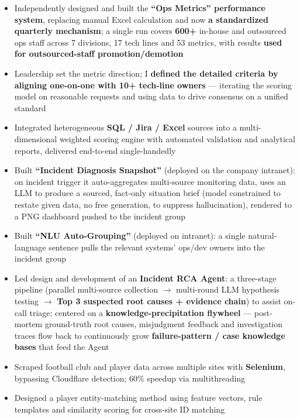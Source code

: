 \documentclass{resume}
\begin{document}
\begin{itemize}[parsep=0.6ex]
  \item Independently designed and built the \textbf{``Ops Metrics'' performance system}, replacing manual Excel calculation and now \textbf{a standardized quarterly mechanism}; a single run covers \textbf{600+} in-house and outsourced ops staff across 7 divisions, 17 tech lines and 53 metrics, with results \textbf{used for outsourced-staff promotion/demotion}
  \item Leadership set the metric direction; I \textbf{defined the detailed criteria by aligning one-on-one with 10+ tech-line owners} --- iterating the scoring model on reasonable requests and using data to drive consensus on a unified standard
  \item Integrated heterogeneous \textbf{SQL / Jira / Excel} sources into a multi-dimensional weighted scoring engine with automated validation and analytical reports, delivered end-to-end single-handedly
  \item Built \textbf{``Incident Diagnosis Snapshot''} (deployed on the company intranet): on incident trigger it auto-aggregates multi-source monitoring data, uses an LLM to produce a sourced, fact-only situation brief (model constrained to restate given data, no free generation, to suppress hallucination), rendered to a PNG dashboard pushed to the incident group
  \item Built \textbf{``NLU Auto-Grouping''} (deployed on intranet): a single natural-language sentence pulls the relevant systems' ops/dev owners into the incident group
  \item Led design and development of an \textbf{Incident RCA Agent}: a three-stage pipeline (parallel multi-source collection $\rightarrow$ multi-round LLM hypothesis testing $\rightarrow$ \textbf{Top 3 suspected root causes + evidence chain}) to assist on-call triage; centered on a \textbf{knowledge-precipitation flywheel} --- post-mortem ground-truth root causes, misjudgment feedback and investigation traces flow back to continuously grow \textbf{failure-pattern / case knowledge bases} that feed the Agent
\end{itemize}

\begin{itemize}[parsep=0.6ex]
  \item Scraped football club and player data across multiple sites with \textbf{Selenium}, bypassing Cloudflare detection; 60\% speedup via multithreading
  \item Designed a player entity-matching method using feature vectors, rule templates and similarity scoring for cross-site ID matching
\end{itemize}
\end{document}
